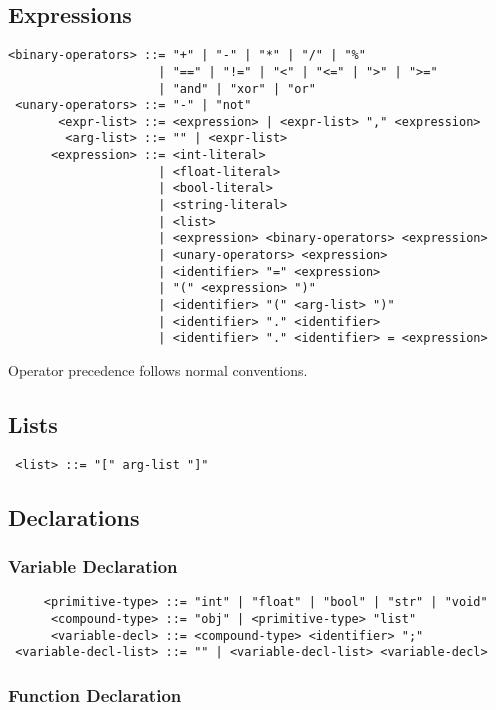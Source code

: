 \subsection{Expressions}
\begin{verbatim}
<binary-operators> ::= "+" | "-" | "*" | "/" | "%"
                     | "==" | "!=" | "<" | "<=" | ">" | ">="
                     | "and" | "xor" | "or"
 <unary-operators> ::= "-" | "not"
       <expr-list> ::= <expression> | <expr-list> "," <expression>
        <arg-list> ::= "" | <expr-list>
      <expression> ::= <int-literal>
                     | <float-literal>
                     | <bool-literal>
                     | <string-literal>
                     | <list>
                     | <expression> <binary-operators> <expression>
                     | <unary-operators> <expression>
                     | <identifier> "=" <expression>
                     | "(" <expression> ")"
                     | <identifier> "(" <arg-list> ")"
                     | <identifier> "." <identifier>
                     | <identifier> "." <identifier> = <expression>
\end{verbatim}

Operator precedence follows normal conventions.

\subsection{Lists}
\begin{verbatim}
 <list> ::= "[" arg-list "]"
\end{verbatim}

\subsection{Declarations}

\subsubsection{Variable Declaration}

\begin{verbatim}
     <primitive-type> ::= "int" | "float" | "bool" | "str" | "void"
      <compound-type> ::= "obj" | <primitive-type> "list"
      <variable-decl> ::= <compound-type> <identifier> ";"
 <variable-decl-list> ::= "" | <variable-decl-list> <variable-decl>
\end{verbatim}

\subsubsection{Function Declaration}

